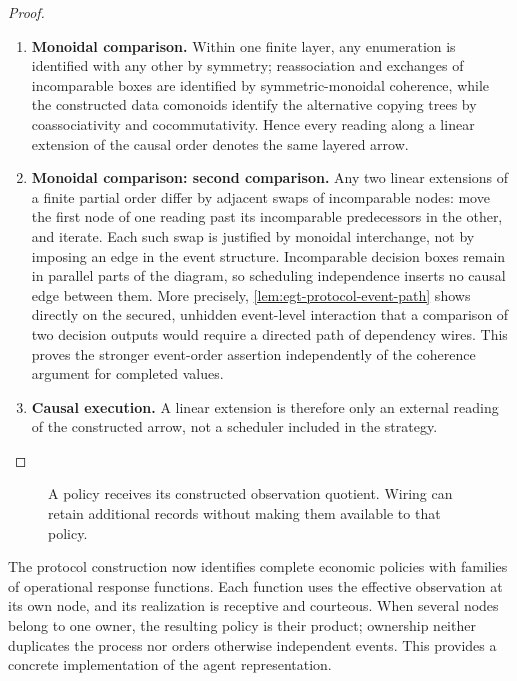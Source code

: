 \documentclass[11pt,a4paper]{article}
\numberwithin{equation}{section}
\theoremstyle{definition}
\theoremstyle{remark}
\theoremstyle{plain}
\begin{document}
\begin{proof}
\begin{enumerate}[label=\textup{(\arabic*)},leftmargin=*,itemsep=4pt,topsep=3pt]
successive layers are composed.
  \item \textbf{Monoidal comparison.} Within one finite layer, any enumeration is
identified with any other by symmetry; reassociation and exchanges of
incomparable boxes are identified by symmetric-monoidal coherence, while the
constructed data comonoids identify the alternative copying trees by
coassociativity and cocommutativity. Hence every reading along a linear
extension of the causal order denotes the same layered arrow.
  \item \textbf{Monoidal comparison: second comparison.} Any two linear extensions of a finite partial order differ by
adjacent swaps of incomparable nodes: move the first node of one reading
past its incomparable predecessors in the other, and iterate. Each such swap is justified by monoidal interchange, not by imposing an
edge in the event structure. Incomparable decision boxes remain in
parallel parts of the diagram, so scheduling independence inserts no
causal edge between them. More precisely,
\cref{lem:egt-protocol-event-path} shows directly on the secured,
unhidden event-level interaction that a comparison of two decision
outputs would require a directed path of dependency wires. This proves
the stronger event-order assertion independently of the coherence
argument for completed values.
  \item \textbf{Causal execution.} A linear extension is
therefore only an external reading of the constructed arrow, not a scheduler
included in the strategy.
\end{enumerate}
\end{proof}


\begin{figure}[htbp]
\centering
{}
\caption{A policy receives its constructed observation quotient. Wiring can
retain additional records without making them available to that policy.}
\end{figure}

The protocol construction now identifies complete economic policies
with families of operational response functions. Each function uses the
effective observation at its own node, and its realization is receptive
and courteous. When several nodes belong to one owner, the resulting
policy is their product; ownership neither duplicates the process nor
orders otherwise independent events. This provides a concrete
implementation of the agent representation.
\end{document}
